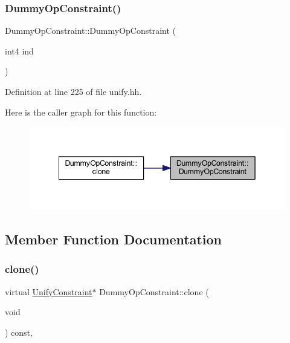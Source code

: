 \subsubsection{\texorpdfstring{DummyOpConstraint()}{DummyOpConstraint()}}
{\footnotesize\ttfamily Dummy\+Op\+Constraint\+::\+Dummy\+Op\+Constraint (\begin{DoxyParamCaption}\item[{int4}]{ind }\end{DoxyParamCaption})\hspace{0.3cm}{\ttfamily [inline]}}



Definition at line 225 of file unify.\+hh.

Here is the caller graph for this function\+:
\nopagebreak
\begin{figure}[H]
\begin{center}
\leavevmode
\includegraphics[width=342pt]{class_dummy_op_constraint_aa3f4a19e008330c55c31c2e3b109e439_icgraph}
\end{center}
\end{figure}


\subsection{Member Function Documentation}
\mbox{\label{class_dummy_op_constraint_a86d183fe63aec86dc883c626287f32ed}} 
\subsubsection{\texorpdfstring{clone()}{clone()}}
{\footnotesize\ttfamily virtual \mbox{\hyperlink{class_unify_constraint}{Unify\+Constraint}}$\ast$ Dummy\+Op\+Constraint\+::clone (\begin{DoxyParamCaption}\item[{void}]{ }\end{DoxyParamCaption}) const\hspace{0.3cm}{\ttfamily [inline]}, {\ttfamily [virtual]}}



